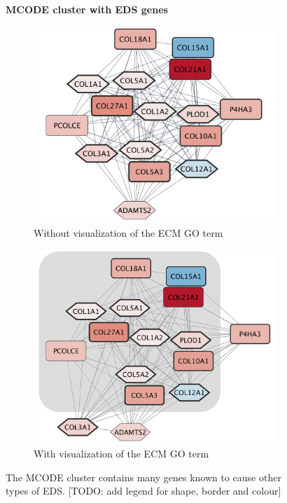 \begin{figure}[htb!]
	\centering
	\caption*{\textbf{MCODE cluster with EDS genes}}
	\begin{subfigure}{.49\textwidth}
		\centering
 		\includegraphics[width=\textwidth]{fig/mcode-cluster-without-enrichment.png}
 			\caption{Without visualization of the ECM GO term}
 	\end{subfigure}
 	\begin{subfigure}{.49\textwidth}
 		\centering
 		\includegraphics[width=\textwidth]{fig/mcode-cluster-eds-genes-with-ecm.png}
 		\caption{With visualization of the ECM GO term}
 	\end{subfigure}
	\caption[MCODE cluster with EDS genes]{\centering The MCODE cluster contains many genes known to cause other types of EDS. [TODO: add legend for shape, border and colour]}
	\label{fig:mcode3}
\end{figure}

